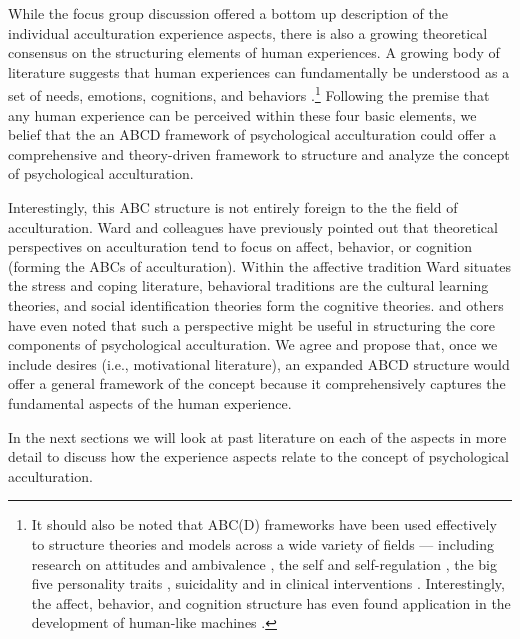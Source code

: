 \documentclass[man, 12pt, a4paper]{apa7}
\begin{document}
While the focus group discussion offered a bottom up description of the individual acculturation experience aspects, there is also a growing theoretical consensus on the structuring elements of human experiences. A growing body of literature suggests that human experiences can fundamentally be understood as a set of needs, emotions, cognitions, and behaviors \citep[sometimes referred to as the ABCs or ABCDs of psychology: affect, behavior, cognition, desire; e.g.,][]{Cottam2010, Hogg2005, Jhangiani2014}.\footnote{It should also be noted that ABC(D) frameworks have been used effectively to structure theories and models across a wide variety of fields --- including research on attitudes \citep{Breckler1984} and ambivalence \citep{VanHarreveld2015}, the self \citep{Cote2009} and self-regulation \citep{Ben-Eliyahu2015}, the big five personality traits \citep{Wilt2016}, suicidality \citep{Harris2015} and in clinical interventions \citep{Eifert1989}. Interestingly, the affect, behavior, and cognition structure has even found application in the development of human-like machines \citep{Guo2020}.} Following the premise that any human experience can be perceived within these four basic elements, we belief that the an ABCD framework of psychological acculturation could offer a comprehensive and theory-driven framework to structure and analyze the concept of psychological acculturation.

Interestingly, this ABC structure is not entirely foreign to the the field of acculturation. Ward and colleagues \citep{Ward2001, Masgoret2006, Ward2019} have previously pointed out that theoretical perspectives on acculturation tend to focus on affect, behavior, or cognition (forming the ABCs of acculturation). Within the affective tradition Ward situates the stress and coping literature, behavioral traditions are the cultural learning theories, and social identification theories form the cognitive theories. \citet{Sam2006b} and others have even noted that such a perspective might be useful in structuring the core components of psychological acculturation. We agree and propose that, once we include desires (i.e., motivational literature), an expanded ABCD structure would offer a general framework of the concept because it comprehensively captures the fundamental aspects of the human experience.

In the next sections we will look at past literature on each of the aspects in more detail to discuss how the experience aspects relate to the concept of psychological acculturation. 
\end{document}
